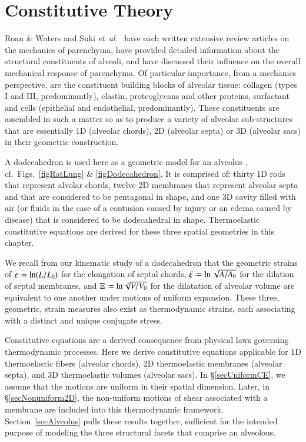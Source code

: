 \part{Constitutive Theory}
\label{partConstitutive}

Roan \& Waters \cite{RoanWaters11} and Suki \textit{et~al}.\ \cite{Sukietal05,Sukietal11} have each written extensive review articles on the mechanics of parenchyma, have provided detailed information about the structural constituents of alveoli, and have discussed their influence on the overall mechanical response of parenchyma.  Of particular importance, from a mechanics perspective, are the constituent building blocks of alveolar tissue: collagen (types I and III, predominantly), elastin, proteoglycans and other proteins, surfactant and cells (epithelial and endothelial, predominantly).  These constituents are assembled in such a matter so as to produce a variety of alveolar sub-structures that are essentially 1D (alveolar chords), 2D (alveolar septa) or 3D (alveolar sacs) in their geometric construction.

A dodecahedron is used here as a geometric model for an alveolus \cite{FrankusLee74}, cf.\ Figs.~\ref{figRatLung} \& \ref{figDodecahedron}.  It is comprised of: thirty 1D rods that represent alvolar chords, twelve 2D membranes that represent alveolar septa and that are considered to be pentagonal in shape, and one 3D cavity filled with air (or fluids in the case of a contusion caused by injury or an edema caused by disease) that is considered to be dodecahedral in shape.  Thermo\-elastic constitutive equations are derived for these three spatial geometries in this chapter.

We recall from our kinematic study of a dodecahedron that the geometric strains of $e \defeq \ln ( L / L_0 )$ for the elongation of septal chords, $\xi \defeq \ln \sqrt{A / A_0}$ for the dilation of septal membranes, and $\Xi \defeq \ln \sqrt[3]{V / V_0}$ for the dilatation of alveolar volume are equivalent to one another under motions of uniform expansion.  These three, geometric, strain measures also exist as thermo\-dynamic strains, each associating with a distinct and unique conjugate stress.

Constitutive equations are a derived consequence from physical laws governing thermo\-dynamic processes.  Here we derive constitutive equations applicable for 1D thermo\-elastic fibers (alveolar chords), 2D thermo\-elastic membranes (alveolar septa), and 3D thermo\-elastic volumes (alveolar sacs).  In \S\ref{secUniformCE}, we assume that the motions are uniform in their spatial dimension.  Later, in \S\ref{secNonuniform2D}, the non-uniform motions of shear associated with a membrane are included into this thermo\-dynamic framework.  Section~\ref{secAlveolus} pulls these results together, sufficient for the intended purpose of modeling the three structural facets that comprise an alveolous.

